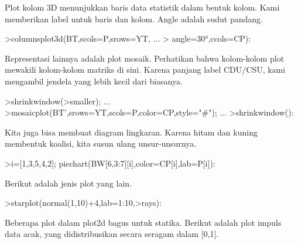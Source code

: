 \documentclass[a4paper,10pt]{article}
\begin{document}
\begin{eulernotebook}
\begin{eulercomment}
\begin{eulercomment}
\begin{eulercomment}
\begin{eulercomment}
\begin{eulercomment}
\begin{eulercomment}
\begin{eulercomment}
\begin{eulercomment}
\begin{eulercomment}
\begin{eulercomment}
\begin{eulercomment}
\begin{eulercomment}
\begin{eulercomment}
\begin{eulercomment}
\begin{eulercomment}
\begin{eulercomment}
\begin{eulercomment}
\begin{eulercomment}
\begin{eulercomment}
\begin{eulercomment}
\begin{eulercomment}
\begin{eulercomment}
\begin{eulercomment}
\begin{eulercomment}
\begin{eulercomment}
\begin{eulercomment}
\begin{eulercomment}
\begin{eulercomment}
\begin{eulercomment}
\begin{eulercomment}
\begin{eulercomment}
\begin{eulercomment}
\begin{eulercomment}
Plot kolom 3D menunjukkan baris data statistik dalam bentuk kolom.
Kami memberikan label untuk baris dan kolom. Angle adalah sudut
pandang.
\end{eulercomment}
\begin{eulerprompt}
>columnsplot3d(BT,scols=P,srows=YT, ...
>  angle=30°,ccols=CP):
\end{eulerprompt}
\begin{eulercomment}
Representasi lainnya adalah plot mosaik. Perhatikan bahwa kolom-kolom
plot mewakili kolom-kolom matriks di sini. Karena panjang label
CDU/CSU, kami mengambil jendela yang lebih kecil dari biasanya.
\end{eulercomment}
\begin{eulerprompt}
>shrinkwindow(>smaller);  ...
>mosaicplot(BT',srows=YT,scols=P,color=CP,style="#"); ...
>shrinkwindow():
\end{eulerprompt}
\begin{eulercomment}
Kita juga bisa membuat diagram lingkaran. Karena hitam dan kuning
membentuk koalisi, kita susun ulang unsur-unsurnya.
\end{eulercomment}
\begin{eulerprompt}
>i=[1,3,5,4,2]; piechart(BW[6,3:7][i],color=CP[i],lab=P[i]):
\end{eulerprompt}
\begin{eulercomment}
Berikut adalah jenis plot yang lain.
\end{eulercomment}
\begin{eulerprompt}
>starplot(normal(1,10)+4,lab=1:10,>rays):
\end{eulerprompt}
\begin{eulercomment}
Beberapa plot dalam plot2d bagus untuk statika. Berikut adalah plot
impuls data acak, yang didistribusikan secara seragam dalam [0,1].
\end{eulercomment}
\begin{eulerprompt}

\end{eulerprompt}
\end{eulercomment}
\end{eulercomment}
\end{eulercomment}
\end{eulercomment}
\end{eulercomment}
\end{eulercomment}
\end{eulercomment}
\end{eulercomment}
\end{eulercomment}
\end{eulercomment}
\end{eulercomment}
\end{eulercomment}
\end{eulercomment}
\end{eulercomment}
\end{eulercomment}
\end{eulercomment}
\end{eulercomment}
\end{eulercomment}
\end{eulercomment}
\end{eulercomment}
\end{eulercomment}
\end{eulercomment}
\end{eulercomment}
\end{eulercomment}
\end{eulercomment}
\end{eulercomment}
\end{eulercomment}
\end{eulercomment}
\end{eulercomment}
\end{eulercomment}
\end{eulercomment}
\end{eulercomment}
\end{eulernotebook}
\end{document}
